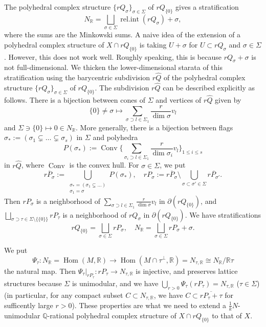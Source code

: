 \documentclass[12pt,a4]{amsart}
\def\R{\mathbb{R}}
\def\Q{\mathbb{Q}}
\def\Conv{\mathop{\mathrm{Conv}}\nolimits}
\def\relint{\mathop{\mathrm{rel.int}}\nolimits}
\def\Hom{\mathop{\mathrm{Hom}}\nolimits}
\numberwithin{equation}{section}
\numberwithin{figure}{section}
\begin{document}
    The polyhedral complex structure $ \{r Q_{\sigma}\}_{\sigma \in \Sigma }$ of $r Q_{ \{ 0 \} }$ 
    gives a stratification 
    $$N_\R = \bigsqcup_{\sigma \in \Sigma} \relint (r Q_{\sigma}) + \sigma,$$
    where the sums are the Minkowski sums. 
    A naive idea of the extension of a  polyhedral complex structure of 
    $X \cap r Q_{ \{ 0 \} }$ is 
    taking $ U + \sigma$ for $U \subset rQ_{\sigma}$ and $\sigma \in \Sigma$.
    However, 
    this does not work well. 
    Roughly speaking, this is 
    because $r Q_{\sigma} + \sigma$ is not full-dimensional.
    We thicken the lower-dimensional starata of 
    this stratification
    using 
     the barycentric subdivision $ r \hat{Q}$ of 
    the polyhedral complex structure $ \{r Q_{\sigma}\}_{\sigma \in \Sigma }$ of $r Q_{ \{ 0 \} }$. 
    The subdivision $ r \hat{Q}$ can be described explicitly as follows.
    There is a bijection between cones of $\Sigma$ and vertices of $r \hat{Q}$ given by 
     $$ \{ 0 \} \neq \sigma \mapsto \sum_{ \sigma \supset l \in \Sigma_1 } \frac{r}{\dim \sigma} v_l $$
     and $\Sigma \ni \{0 \} \mapsto 0 \in N_\R$.
     More generally, 
     there is a bijection 
     between flags $\sigma_{*}:=( \sigma_1 \subsetneq \dots  \subsetneq \sigma_s )$ in 
     $\Sigma$
     and polyhedra 
     $$P(\sigma_*) :=   \Conv \bigg\{ \sum_{ \sigma_i \supset l \in \Sigma_1 } \frac{r}{\dim \sigma_i} v_l 
     \bigg\}_{1\leq i\leq s} $$ in $r \hat{Q}$, 
     where $\Conv$ is the convex hull.
    For  $\sigma \in \Sigma$, 
     we put 
       $$ \overline{rP_{\sigma}} 
            := \bigcup_{ 
            \substack{ \sigma_* =(\sigma_1 \subsetneq \dots  ) \\ \sigma_1=\sigma } }
             P(\sigma_*), 
             \quad 
              rP_{\sigma}  := 
          \overline{rP_{\sigma}} 
           \setminus  \bigcup_{\sigma \subset \sigma' \in \Sigma}
          \overline{rP_{\sigma' }} .
          $$
          Then $rP_{\sigma}$
          is a neighborhood of 
          $\sum_{ \sigma \supset l \in \Sigma_1 } \frac{r}{\dim \sigma} v_l$
     in $\partial (rQ_{ \{0\} })$, 
     and 
      $
      \bigsqcup_{\sigma \supset \tau \in \Sigma \setminus \{ \{ 0 \} \}}  rP_{\tau}  $
      is a neighborhood of 
     $ rQ_{\sigma } $
     in $\partial (rQ_{ \{0\} })$.
      We have  
    stratifications 
      $$ rQ_{ \{ 0 \} } 
          = \bigsqcup_{\sigma \in \Sigma} rP_{\sigma} , 
          \quad 
        N_\R = 
           \bigsqcup_{\sigma \in \Sigma} rP_{\sigma} + \sigma .$$

    We put 
    $$\Psi_\tau \colon N_\R= \Hom (M,\R) \to 
      \Hom (M\cap \tau^{\perp} , \R) = N_{\tau,\R} \cong N_\R / \R \tau$$
    the natural map. 
    Then 
     $\Psi_{\tau}|_{rP_{\tau}} \colon rP_{\tau} \to N_{\tau,\R} $ is injective, 
     and 
     preserves lattice structures 
   because $\Sigma$ is unimodular,
     and 
   we have 
   $ \bigcup_{r >0} \Psi_{\tau} (rP_{\tau}) = N_{\tau,\R}$
    ($\tau \in \Sigma$) 
    (in particular, for any compact subset $C \subset N_{\tau, \R}$, we have  
    $  C \subset  \overline{rP_{\tau}+ \tau} $ for sufficently large $r >0 $).
  These properties are what we need to extend a  
   $\frac{1}{k}N$-unimodular
    $\Q$-rational polyhedral complex structure of 
    $X \cap r Q_{ \{ 0 \} }$ to that of $X$.
   
\end{document}
